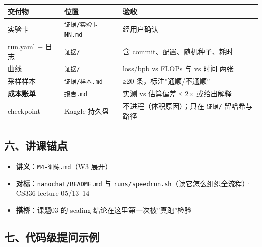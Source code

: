 \documentclass[
  chinese,
  11pt,
]{ctexart}
\newcounter{none} %
\providecommand{\tightlist}{%
  \setlength{\itemsep}{0pt}\setlength{\parskip}{0pt}}
\begin{document}
{\def\LTcaptype{none} %
\begin{longtable}[]{@{}
  >{\raggedright\arraybackslash}p{}
  >{\raggedright\arraybackslash}p{}
  >{\raggedright\arraybackslash}p{}@{}}
\toprule\noalign{}
\begin{minipage}[b]{\linewidth}\raggedright
交付物
\end{minipage} & \begin{minipage}[b]{\linewidth}\raggedright
位置
\end{minipage} & \begin{minipage}[b]{\linewidth}\raggedright
验收
\end{minipage} \\
\midrule\noalign{}
\endhead
\bottomrule\noalign{}
\endlastfoot
实验卡 & \texttt{证据/实验卡-NN.md} & 经用户确认 \\
run.yaml + 日志 & \texttt{证据/} & 含 commit、配置、随机种子、耗时 \\
曲线 & \texttt{证据/} & loss/bpb vs FLOPs 与 vs 时间 两张 \\
采样样本 & \texttt{证据/样本.md} & ≥20 条，标注''通顺/不通顺'' \\
\textbf{成本账单} & \texttt{报告.md} & 实测 vs 估算偏差 ≤ 2× 或给出解释 \\
checkpoint & Kaggle 持久盘 & 不进程（体积原因）；只在 \texttt{证据/} 留哈希与路径 \\
\end{longtable}
}

\subsection{六、讲课锚点}\label{ux516dux8bb2ux8bfeux951aux70b9}

\begin{itemize}
\tightlist
\item
  \textbf{讲义}：\texttt{M4-训练.md}（W3 展开）
\item
  \textbf{对标}：\texttt{nanochat/README.md} 与 \texttt{runs/speedrun.sh}（读它怎么组织全流程）· CS336 lecture 05/13--14
\item
  \textbf{搭桥}：课题03 的 scaling 结论在这里第一次被''真跑''检验
\end{itemize}

\subsection{七、代码级提问示例}\label{ux4e03ux4ee3ux7801ux7ea7ux63d0ux95eeux793aux4f8b}
\end{document}
